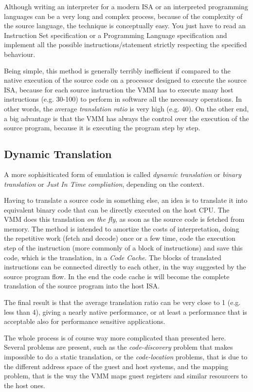 Although writing an interpreter for a modern ISA or an interpreted programming languages can be a very long and complex process,
because of the complexity of the source language, the technique is conceptually easy. You just have to read an Instruction Set 
specification or a Programming Language specification and implement all the possible instructions/statement strictly respecting
the specified behaviour.

Being simple, this method is generally terribly inefficient if compared to the native execution of the source code on a processor
designed to execute the source ISA, because for each source instruction the VMM has to execute many host instructions (e.g. 30-100)
to perform in software all the necessary operations. In other words, the average \emph{translation ratio} is very high (e.g. 40).
On the other end, a big advantage is that the VMM has always the control over the execution of the source program, because it is 
executing the program step by step.


\subsection{Dynamic Translation}
A more sophisiticated form of emulation is called \emph{dynamic translation} or \emph{binary translation} or 
\emph{Just In Time compliation}, depending on the context.

Having to translate a source code in something else, an idea is to translate it into equivalent binary code that can be directly
executed on the host CPU. The VMM does this translation \emph{on the fly}, as soon as the source code is fetched from memory.
The method is intended to amortize the costs of interpretation, doing the repetitive work (fetch and decode) once or a few time,
code the execution step of the instruction (more commonly of a block of instructions) and save this code, which is the translation,
in a \emph{Code Cache}. The blocks of translated instructions can be connected directly to each other, in the way suggested
by the source program flow. In the end the code cache is will become the complete translation of the source program into the
host ISA.

The final result is that the average translation ratio can be very close to 1 (e.g. less than 4), giving a nearly native performance,
or at least a performance that is acceptable also for performance sensitive applications.

The whole process is of course way more complicated than presented here. Several problems are present, such as the 
\emph{code-discovery} problem that makes impossible to do a static translation, or the \emph{code-location} problems, that is due
to the different address space of the guest and host systems, and the mapping problem, that is the way the VMM maps guest registers
and similar resourcers to the host ones.

